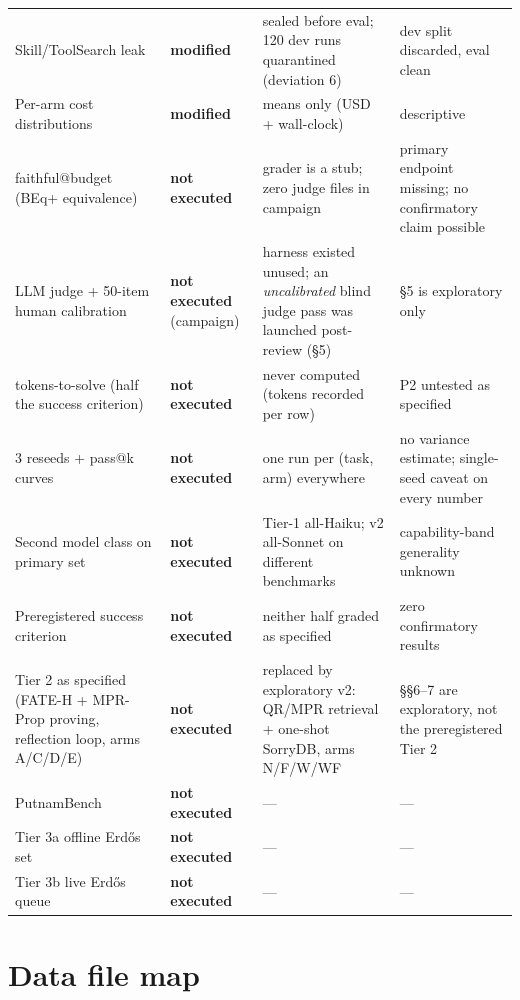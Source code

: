 \documentclass[10pt]{article}
\begin{document}
{\begin{longtable}{@{}p{}p{}p{}p{}@{}}
Skill/ToolSearch leak & \textbf{modified} & sealed before eval; 120 dev runs quarantined (deviation 6) & dev split discarded, eval clean \\
Per-arm cost distributions & \textbf{modified} & means only (USD + wall-clock) & descriptive \\
faithful@budget (BEq+ equivalence) & \textbf{not executed} & grader is a stub; zero judge files in campaign & primary endpoint missing; no confirmatory claim possible \\
LLM judge + 50-item human calibration & \textbf{not executed} (campaign) & harness existed unused; an \emph{uncalibrated} blind judge pass was launched post-review (\S5) & \S5 is exploratory only \\
tokens-to-solve (half the success criterion) & \textbf{not executed} & never computed (tokens recorded per row) & P2 untested as specified \\
3 reseeds + pass@k curves & \textbf{not executed} & one run per (task, arm) everywhere & no variance estimate; single-seed caveat on every number \\
Second model class on primary set & \textbf{not executed} & Tier-1 all-Haiku; v2 all-Sonnet on different benchmarks & capability-band generality unknown \\
Preregistered success criterion & \textbf{not executed} & neither half graded as specified & zero confirmatory results \\
Tier 2 as specified (FATE-H + MPR-Prop proving, reflection loop, arms A/C/D/E) & \textbf{not executed} & replaced by exploratory v2: QR/MPR retrieval + one-shot SorryDB, arms N/F/W/WF & \S\S6--7 are exploratory, not the preregistered Tier 2 \\
PutnamBench & \textbf{not executed} & --- & --- \\
Tier 3a offline Erd\H{o}s set & \textbf{not executed} & --- & --- \\
Tier 3b live Erd\H{o}s queue & \textbf{not executed} & --- & --- \\
\end{longtable}
}

\section{Data file map}\label{app:files}
\end{document}
